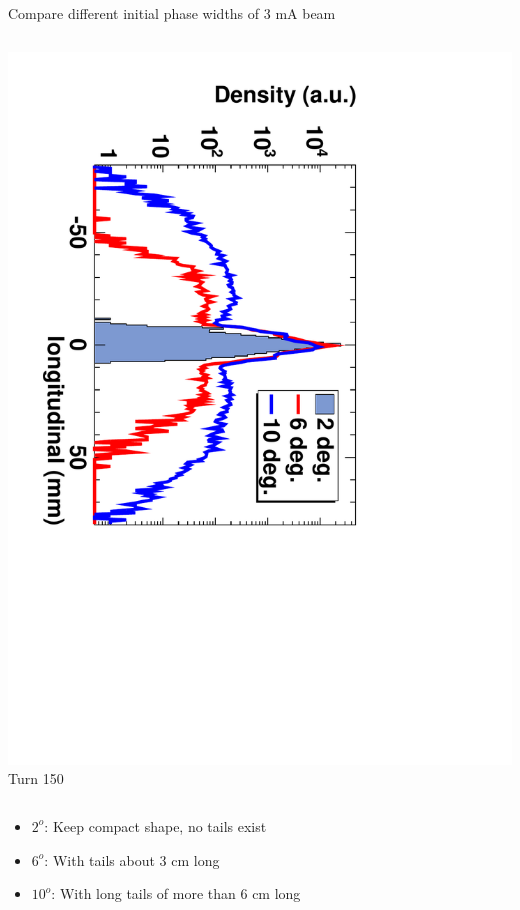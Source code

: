 \documentclass[xcolor=pdftex,table,10pt,yellow,mathserif]{beamer}
\begin{document}
{\begin{block}{Compare different initial phase widths of 3 mA beam}
\begin{columns}
\begin{column}{3.0cm}
      \includegraphics[angle=90,width=\linewidth]{figures/Theta-Turn-150.pdf} \\
      \center Turn 150
    \end{column}
  \end{columns}
  \end{block}
  \begin{block}{}  
    \begin{itemize}
      \item $2^o$:  Keep compact shape, no tails exist
      \item $6^o$:  With tails about 3 cm long
      \item $10^o$: With long tails of more than 6 cm long
    \end{itemize}
  \end{block}

}
\end{document}
